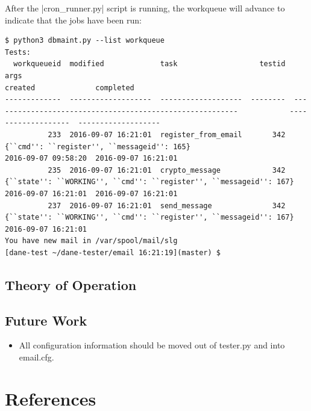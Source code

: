 \documentclass[preprint,3p,11pt]{elsarticle}
\begin{document}
After the |cron_runner.py| script is running, the workqueue will
advance to indicate that the jobs have been run:

\begin{Verbatim}[commandchars=\\\{\}]
 $ python3 dbmaint.py --list workqueue
Tests:
  workqueueid  modified             task                   testid  args                                                                 created              completed
-------------  -------------------  -------------------  --------  ---------------------------------------------------------            -------------------  -------------------
          233  2016-09-07 16:21:01  register_from_email       342  {``cmd'': ``register'', ``messageid'': 165}                          2016-09-07 09:58:20  2016-09-07 16:21:01
          235  2016-09-07 16:21:01  crypto_message            342  {``state'': ``WORKING'', ``cmd'': ``register'', ``messageid'': 167}  2016-09-07 16:21:01  2016-09-07 16:21:01
          237  2016-09-07 16:21:01  send_message              342  {``state'': ``WORKING'', ``cmd'': ``register'', ``messageid'': 167}  2016-09-07 16:21:01
You have new mail in /var/spool/mail/slg
[dane-test ~/dane-tester/email 16:21:19](master) $
\end{Verbatim}

\subsection{Theory of Operation}

\subsection{Future Work}
\begin{itemize}
\item All configuration information should be moved out of tester.py
  and into email.cfg.
\end{itemize}

\section*{References}


\end{document}
